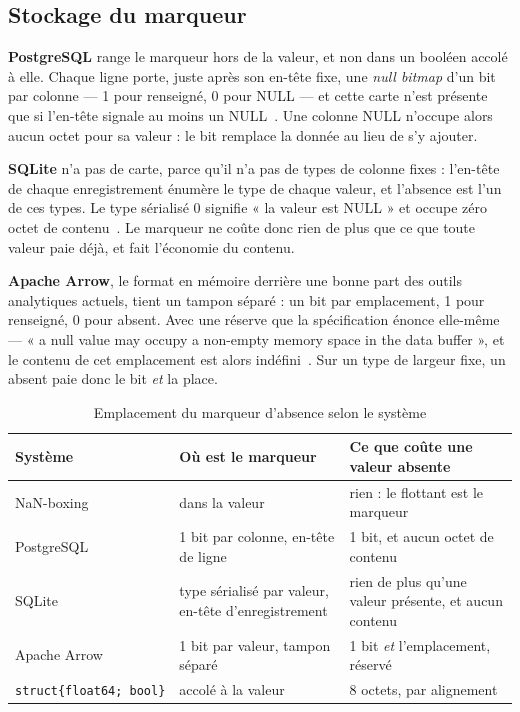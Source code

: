 \documentclass[11pt,a4paper]{report}
\begin{document}
\subsection{Stockage du marqueur}

\textbf{PostgreSQL} range le marqueur hors de la valeur, et non dans un
booléen accolé à elle. Chaque ligne porte, juste après son en-tête fixe,
une \emph{null bitmap} d'un bit par colonne --- 1 pour renseigné, 0 pour
NULL --- et cette carte n'est présente que si l'en-tête signale au moins
un NULL~\cite{pgstorage}. Une colonne NULL n'occupe alors aucun octet
pour sa valeur : le bit remplace la donnée au lieu de s'y ajouter.

\textbf{SQLite} n'a pas de carte, parce qu'il n'a pas de types de
colonne fixes : l'en-tête de chaque enregistrement énumère le type de
chaque valeur, et l'absence est l'un de ces types. Le type sérialisé 0
signifie « la valeur est NULL » et occupe zéro octet de
contenu~\cite{sqliteformat}. Le marqueur ne coûte donc rien de plus que
ce que toute valeur paie déjà, et fait l'économie du contenu.

\textbf{Apache Arrow}, le format en mémoire derrière une bonne part des
outils analytiques actuels, tient un tampon séparé : un bit par
emplacement, 1 pour renseigné, 0 pour absent. Avec une réserve que la
spécification énonce elle-même --- « a null value may occupy a
non-empty memory space in the data buffer », et le contenu de cet
emplacement est alors indéfini~\cite{arrowformat}. Sur un type de
largeur fixe, un absent paie donc le bit \emph{et} la place.

\begin{table}[htbp]
\centering
\small
\caption{Emplacement du marqueur d'absence selon le
système}\label{tab:marqueurs}
\begin{tabular}{@{}p{4.2cm}p{4.6cm}p{5.4cm}@{}}
\toprule
\textbf{Système} & \textbf{Où est le marqueur} & \textbf{Ce que coûte une
valeur absente} \\
\midrule
NaN-boxing & dans la valeur & rien : le flottant est le marqueur \\
PostgreSQL & 1 bit par colonne, en-tête de ligne & 1 bit, et aucun octet
de contenu \\
SQLite & type sérialisé par valeur, en-tête d'enregistrement & rien de
plus qu'une valeur présente, et aucun contenu \\
Apache Arrow & 1 bit par valeur, tampon séparé & 1 bit \emph{et}
l'emplacement, réservé \\
\texttt{struct\{float64;\ bool\}} & accolé à la valeur & 8 octets, par
alignement \\
\bottomrule
\end{tabular}
\end{table}
\end{document}
